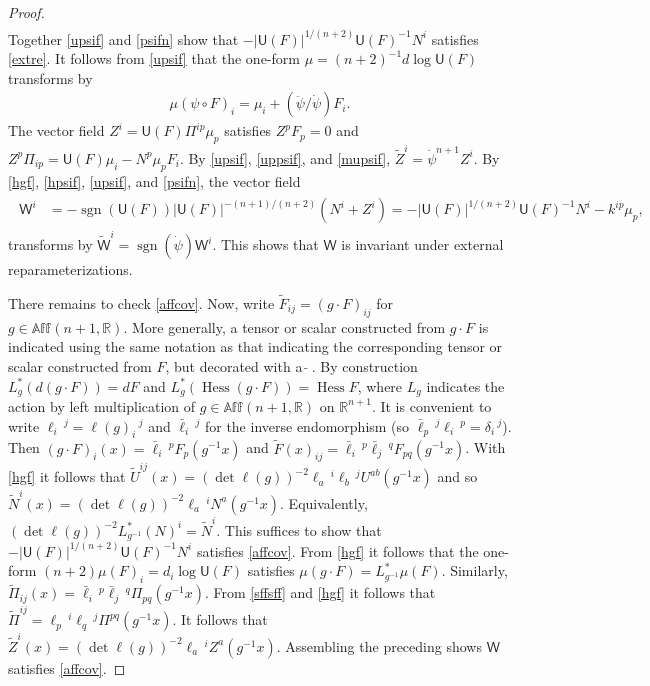\documentclass [leqno, 10pt]{amsart}
\theoremstyle{definition}
\numberwithin{equation}{section}
\newcommand{\muf}{\mu}
\newcommand{\U}{\mathsf{U}}
\newcommand{\hess}{\operatorname{Hess}}
\newcommand{\sff}{\Pi}
\newcommand{\nm}{\mathsf{W}}
\newcommand{\sign}{\operatorname{sgn}}
\newcommand{\Aff}{\mathbb{Aff}}
\newcommand{\rea}{\mathbb R}
\begin{document}
\begin{proof}
\begin{align}
\end{align}
Together \eqref{upsif} and \eqref{psifn} show that $-|\U(F)|^{1/(n+2)}\U(F)^{-1}N^{i}$ satisfies \eqref{extre}.
It follows from \eqref{upsif} that the one-form $\muf = (n+2)^{-1}d\log\U(F)$ transforms by 
\begin{align}\label{mupsif}
\muf(\psi \circ F)_{i} = \muf_{i} + (\ddot{\psi}/ \dot{\psi})F_{i}.
\end{align}
The vector field $Z^{i} = \U(F)\sff^{ip}\muf_{p}$ satisfies $Z^{p}F_{p} = 0$ and $Z^{p}\sff_{ip} = \U(F)\muf_{i} - N^{p}\muf_{p}F_{i}$. By \eqref{upsif}, \eqref{uppsif}, and \eqref{mupsif}, $\tilde{Z}^{i} = \dot{\psi}^{n+1}Z^{i}$. By \eqref{hgf}, \eqref{hpsif}, \eqref{upsif}, and \eqref{psifn}, the vector field
\begin{align}\label{nm1}
\begin{split}
\nm^{i} &= - \sign(\U(F))|\U(F)|^{-(n+1)/(n+2)}\left(N^{i} + Z^{i}\right) = -|\U(F)|^{1/(n+2)}\U(F)^{-1}N^{i} - k^{ip}\muf_{p},
\end{split}
\end{align}
transforms by $\tilde{\nm}^{i} = \sign(\dot{\psi})\nm^{i}$. This shows that $\nm$ is invariant under external reparameterizations.

There remains to check \eqref{affcov}. Now, write $\tilde{F}_{ij} = (g \cdot F)_{ij}$ for $g \in \Aff(n+1, \rea)$. More generally, a tensor or scalar constructed from $g\cdot F$ is indicated using the same notation as that indicating the corresponding tensor or scalar constructed from $F$, but decorated with a $\tilde{\,}\,$. By construction $L_{g}^{\ast}(d(g\cdot F)) = dF$ and $L_{g}^{\ast}(\hess(g\cdot F)) = \hess F$, where $L_{g}$ indicates the action by left multiplication of $g \in \Aff(n+1, \rea)$ on $\rea^{n+1}$. It is convenient to write $\ell_{i}\,^{j} = \ell(g)_{i}\,^{j}$ and $\bar{\ell}_{i}\,^{j}$ for the inverse endomorphism (so $\bar{\ell}_{p}\,^{j}\ell_{i}\,^{p} = \delta_{i}\,^{j}$). Then $(g\cdot F)_{i}(x) = \bar{\ell}_{i}\,^{p}F_{p}(g^{-1}x)$ and $\tilde{F}(x)_{ij} = \bar{\ell}_{i}\,^{p}\bar{\ell}_{j}\,^{q}F_{pq}(g^{-1}x)$. With \eqref{hgf} it follows that $\tilde{U}^{ij}(x) = (\det \ell(g))^{-2}\ell_{a}\,^{i}\ell_{b}\,^{j}U^{ab}(g^{-1}x)$ and so $\tilde{N}^{i}(x) = (\det \ell(g))^{-2}\ell_{a}\,^{i}N^{a}(g^{-1}x)$. Equivalently, $(\det \ell(g))^{-2}L_{g^{-1}}^{\ast}(N)^{i} = \tilde{N}^{i}$. This suffices to show that $-|\U(F)|^{1/(n+2)}\U(F)^{-1}N^{i}$ satisfies \eqref{affcov}. From \eqref{hgf} it follows that the one-form $(n+2)\muf(F)_{i} = d_{i}\log \U(F)$ satisfies $\muf(g\cdot F) = L_{g^{-1}}^{\ast}\muf(F)$. Similarly, $\tilde{\sff}_{ij}(x) = \bar{\ell}_{i}\,^{p}\bar{\ell}_{j}\,^{q}\sff_{pq}(g^{-1}x)$. From \eqref{sffsff} and \eqref{hgf} it follows that $\tilde{\sff}^{ij} = \ell_{p}\,^{i}\ell_{q}\,^{j}\sff^{pq}(g^{-1}x)$. It follows that $\tilde{Z}^{i}(x) = (\det \ell(g))^{-2}\ell_{a}\,^{i}Z^{a}(g^{-1}x)$. Assembling the preceding shows $\nm$ satisfies \eqref{affcov}.


\end{proof}
\end{document}
